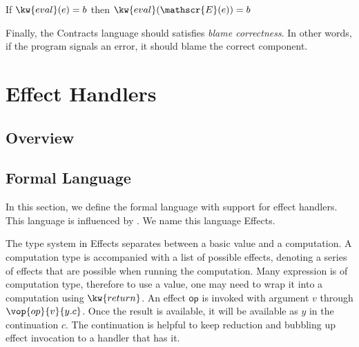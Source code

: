 \begin{theorem}
  If $\kw{eval}(e) = b$ then $\kw{eval}(\mathscr{E}(e)) = b$

\end{theorem}


Finally, the Contracts language should satisfies \textit{blame correctness}. In other words, if the program signals an error, it should blame the correct component.

\begin{theorem}

\end{theorem}


\section{Effect Handlers}

\subsection{Overview}

\subsection{Formal Language}

In this section, we define the formal language with support for effect handlers. This language is influenced by \cite{introeffecthandlers}. We name this language Effects.

The type system in Effects separates between a basic value and a computation. A computation type is accompanied with a list of possible effects, denoting a series of effects that are possible when running the computation. Many expression is of computation type, therefore to use a value, one may need to wrap it into a computation using $\kw{return}$.
An effect $\mathsf{op}$ is invoked with argument $v$ through $\vop{op}{v}{y.c}$. Once the result is available, it will be available as $y$ in the continuation $c$. The continuation is helpful to keep reduction and bubbling up effect invocation to a handler that has it.


